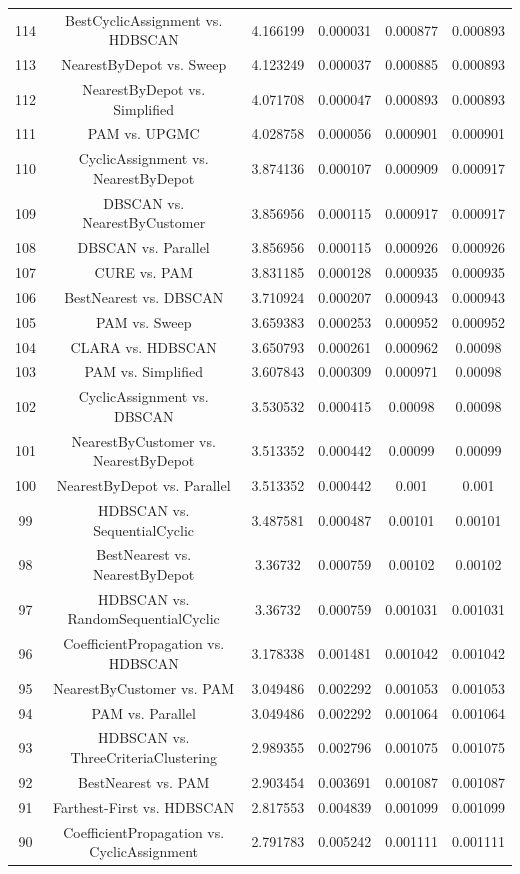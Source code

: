\documentclass[a4paper,10pt]{article}
\begin{document}
\begin{landscape}
\begin{table}[!htp]
\begin{tabular}{cccccc}
114&BestCyclicAssignment vs. HDBSCAN&4.166199&0.000031&0.000877&0.000893\\
113&NearestByDepot vs. Sweep&4.123249&0.000037&0.000885&0.000893\\
112&NearestByDepot vs. Simplified&4.071708&0.000047&0.000893&0.000893\\
111&PAM vs. UPGMC&4.028758&0.000056&0.000901&0.000901\\
110&CyclicAssignment vs. NearestByDepot&3.874136&0.000107&0.000909&0.000917\\
109&DBSCAN vs. NearestByCustomer&3.856956&0.000115&0.000917&0.000917\\
108&DBSCAN vs. Parallel&3.856956&0.000115&0.000926&0.000926\\
107&CURE vs. PAM&3.831185&0.000128&0.000935&0.000935\\
106&BestNearest vs. DBSCAN&3.710924&0.000207&0.000943&0.000943\\
105&PAM vs. Sweep&3.659383&0.000253&0.000952&0.000952\\
104&CLARA vs. HDBSCAN&3.650793&0.000261&0.000962&0.00098\\
103&PAM vs. Simplified&3.607843&0.000309&0.000971&0.00098\\
102&CyclicAssignment vs. DBSCAN&3.530532&0.000415&0.00098&0.00098\\
101&NearestByCustomer vs. NearestByDepot&3.513352&0.000442&0.00099&0.00099\\
100&NearestByDepot vs. Parallel&3.513352&0.000442&0.001&0.001\\
99&HDBSCAN vs. SequentialCyclic&3.487581&0.000487&0.00101&0.00101\\
98&BestNearest vs. NearestByDepot&3.36732&0.000759&0.00102&0.00102\\
97&HDBSCAN vs. RandomSequentialCyclic&3.36732&0.000759&0.001031&0.001031\\
96&CoefficientPropagation vs. HDBSCAN&3.178338&0.001481&0.001042&0.001042\\
95&NearestByCustomer vs. PAM&3.049486&0.002292&0.001053&0.001053\\
94&PAM vs. Parallel&3.049486&0.002292&0.001064&0.001064\\
93&HDBSCAN vs. ThreeCriteriaClustering&2.989355&0.002796&0.001075&0.001075\\
92&BestNearest vs. PAM&2.903454&0.003691&0.001087&0.001087\\
91&Farthest-First vs. HDBSCAN&2.817553&0.004839&0.001099&0.001099\\
90&CoefficientPropagation vs. CyclicAssignment&2.791783&0.005242&0.001111&0.001111\\

\end{tabular}
\end{table}
\end{landscape}
\end{document}
